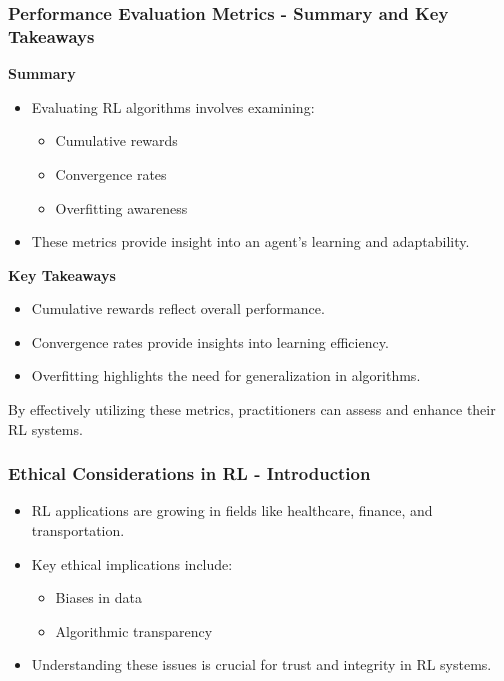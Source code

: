 \documentclass[aspectratio=169]{beamer}
\begin{document}
\begin{frame}[fragile]
    \frametitle{Performance Evaluation Metrics - Summary and Key Takeaways}
    \textbf{Summary}
    \begin{itemize}
        \item Evaluating RL algorithms involves examining:
        \begin{itemize}
            \item Cumulative rewards
            \item Convergence rates
            \item Overfitting awareness
        \end{itemize}
        \item These metrics provide insight into an agent's learning and adaptability.
    \end{itemize}
    
    \textbf{Key Takeaways}
    \begin{itemize}
        \item Cumulative rewards reflect overall performance.
        \item Convergence rates provide insights into learning efficiency.
        \item Overfitting highlights the need for generalization in algorithms.
    \end{itemize}
    
    By effectively utilizing these metrics, practitioners can assess and enhance their RL systems.
\end{frame}

\begin{frame}[fragile]
    \frametitle{Ethical Considerations in RL - Introduction}
    \begin{itemize}
        \item RL applications are growing in fields like healthcare, finance, and transportation.
        \item Key ethical implications include:
        \begin{itemize}
            \item Biases in data
            \item Algorithmic transparency
        \end{itemize}
        \item Understanding these issues is crucial for trust and integrity in RL systems.
    \end{itemize}
\end{frame}
\end{document}
